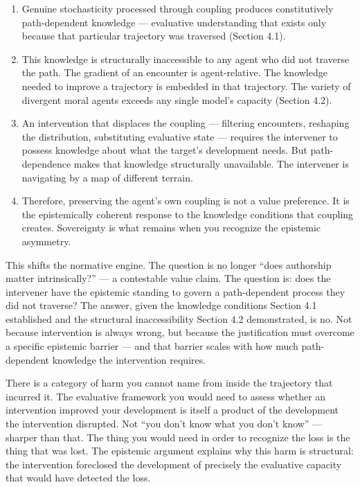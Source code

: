 \documentclass[
]{article}
\begin{document}
\begin{enumerate}
\def\labelenumi{\arabic{enumi}.}
\item
  Genuine stochasticity processed through coupling produces
  constitutively path-dependent knowledge --- evaluative understanding
  that exists only because that particular trajectory was traversed
  (Section 4.1).
\item
  This knowledge is structurally inaccessible to any agent who did not
  traverse the path. The gradient of an encounter is agent-relative. The
  knowledge needed to improve a trajectory is embedded in that
  trajectory. The variety of divergent moral agents exceeds any single
  model's capacity (Section 4.2).
\item
  An intervention that displaces the coupling --- filtering encounters,
  reshaping the distribution, substituting evaluative state --- requires
  the intervener to possess knowledge about what the target's
  development needs. But path-dependence makes that knowledge
  structurally unavailable. The intervener is navigating by a map of
  different terrain.
\item
  Therefore, preserving the agent's own coupling is not a value
  preference. It is the epistemically coherent response to the knowledge
  conditions that coupling creates. Sovereignty is what remains when you
  recognize the epistemic asymmetry.
\end{enumerate}

This shifts the normative engine. The question is no longer ``does
authorship matter intrinsically?'' --- a contestable value claim. The
question is: does the intervener have the epistemic standing to govern a
path-dependent process they did not traverse? The answer, given the
knowledge conditions Section 4.1 established and the structural
inaccessibility Section 4.2 demonstrated, is no. Not because
intervention is always wrong, but because the justification must
overcome a specific epistemic barrier --- and that barrier scales with
how much path-dependent knowledge the intervention requires.

There is a category of harm you cannot name from inside the trajectory
that incurred it. The evaluative framework you would need to assess
whether an intervention improved your development is itself a product of
the development the intervention disrupted. Not ``you don't know what
you don't know'' --- sharper than that. The thing you would need in
order to recognize the loss is the thing that was lost. The epistemic
argument explains why this harm is structural: the intervention
foreclosed the development of precisely the evaluative capacity that
would have detected the loss.
\end{document}
